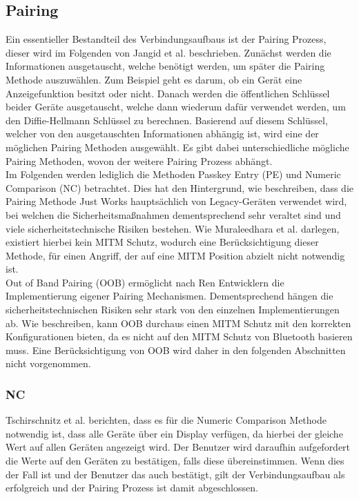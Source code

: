 \documentclass[
    a4paper,
    pagesize,
    pdftex,
    12pt,
]{scrartcl}
\begin{document}
    \subsection{Pairing}
    Ein essentieller Bestandteil des Verbindungsaufbaus ist der Pairing Prozess, dieser wird im Folgenden von Jangid et al.  \cite{bluetooth_formal_analysis} beschrieben. Zunächst werden die Informationen ausgetauscht, welche benötigt werden, um später die Pairing Methode auszuwählen. Zum Beispiel geht es darum, ob ein Gerät eine Anzeigefunktion besitzt oder nicht. Danach werden die öffentlichen Schlüssel beider Geräte ausgetauscht, welche dann wiederum dafür verwendet werden, um den Diffie-Hellmann Schlüssel zu berechnen. Basierend auf diesem Schlüssel, welcher von den ausgetauschten Informationen abhängig ist, wird eine der möglichen Pairing Methoden ausgewählt. Es gibt dabei unterschiedliche mögliche Pairing Methoden, wovon der weitere Pairing Prozess abhängt. \\
    Im Folgenden werden lediglich die Methoden Passkey Entry (PE) und Numeric Comparison (NC) betrachtet. Dies hat den Hintergrund, wie \cite{bluetooth_newest_security_risks} beschreiben, dass die Pairing Methode Just Works hauptsächlich von Legacy-Geräten verwendet wird, bei welchen die Sicherheitsmaßnahmen dementsprechend sehr veraltet sind und viele sicherheitstechnische Risiken bestehen. Wie Muraleedhara et al. \cite{bluetooth_newest_security_risks} darlegen, existiert hierbei kein MITM Schutz, wodurch eine Berücksichtigung dieser Methode, für einen Angriff, der auf eine MITM Position abzielt nicht notwendig ist. \\
    Out of Band Pairing (OOB) ermöglicht nach Ren \cite{bluetooth_oob} Entwicklern die Implementierung eigener Pairing Mechanismen. Dementsprechend hängen die sicherheitstechnischen Risiken sehr stark von den einzelnen Implementierungen ab. Wie \cite{method_confusion_attack} beschreiben, kann OOB durchaus einen MITM Schutz mit den korrekten Konfigurationen  bieten, da es nicht auf den MITM Schutz von Bluetooth basieren muss. Eine Berücksichtigung von OOB wird daher in den folgenden Abschnitten nicht vorgenommen.

    \subsubsection{NC}
    Tschirschnitz et al. \cite{method_confusion_attack} berichten, dass es für die Numeric Comparison Methode notwendig ist, dass alle Geräte über ein Display verfügen, da hierbei der gleiche Wert auf allen Geräten angezeigt wird. Der Benutzer wird daraufhin aufgefordert die Werte auf den Geräten zu bestätigen, falls diese übereinstimmen. Wenn dies der Fall ist und der Benutzer das auch bestätigt, gilt der Verbindungsaufbau als erfolgreich und der Pairing Prozess ist damit abgeschlossen.
\end{document}
